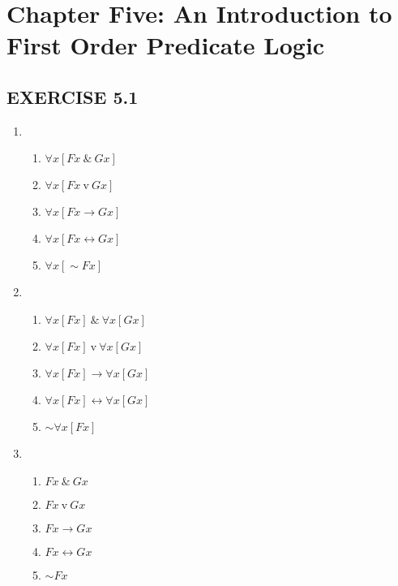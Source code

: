 \documentclass[a4paper,12pt]{article}
\newcommand{\ra}{\rightarrow}
\newcommand{\lra}{\leftrightarrow}
\newcommand{\s}{\sim}
\newcommand{\tv}{ \ \textrm{v} \ }
\newcommand{\ta}{ \ \& \ }
\newcommand{\all}{\forall}
\begin{document}
    \newpage

    \section*{Chapter Five: An Introduction to First Order Predicate Logic}

    \subsection*{EXERCISE 5.1}

    \begin{enumerate}[label=\arabic*,leftmargin=*]
        \item
            \nopagebreak
            \begin{enumerate}[label=(\roman*)]
                \item $\all x [Fx \ta Gx]$
                \item $\all x [Fx \tv Gx]$
                \item $\all x [Fx \ra Gx]$
                \item $\all x [Fx \lra Gx]$
                \item $\all x [\s Fx]$
            \end{enumerate}
        \item
            \nopagebreak
            \begin{enumerate}[label=(\roman*)]
                \item $\all x [Fx] \ta \all x [Gx]$
                \item $\all x [Fx] \tv \all x [Gx]$
                \item $\all x [Fx] \ra \all x [Gx]$
                \item $\all x [Fx] \lra \all x [Gx]$
                \item $\s \all x [Fx]$
            \end{enumerate}
        \item
            \nopagebreak
            \begin{enumerate}[label=(\roman*)]
                \item $Fx \ta Gx$
                \item $Fx \tv Gx$
                \item $Fx \ra Gx$
                \item $Fx \lra Gx$
                \item $\s Fx$
            \end{enumerate}
    \end{enumerate}
\end{document}
